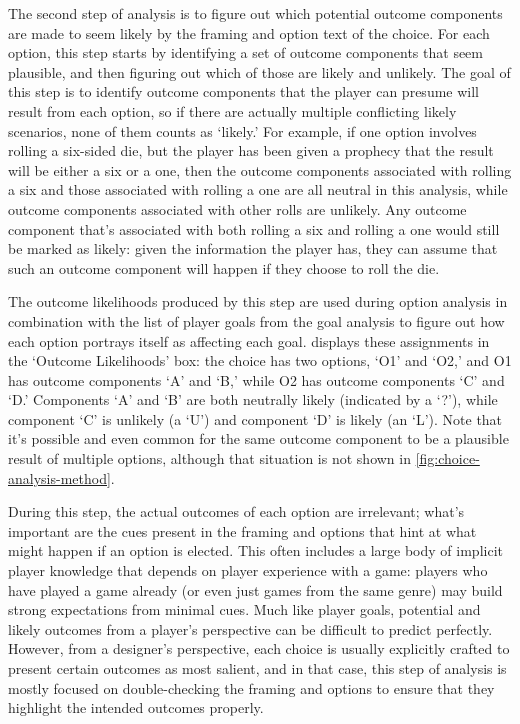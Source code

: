 \label{sec:cp-likelihood-analysis}

The second step of analysis is to figure out which potential outcome components are made to seem likely by the framing and option text of the choice.
%
For each option, this step starts by identifying a set of outcome components that seem plausible, and then figuring out which of those are likely and unlikely.
%
The goal of this step is to identify outcome components that the player can presume will result from each option, so if there are actually multiple conflicting likely scenarios, none of them counts as `likely.'
%
For example, if one option involves rolling a six-sided die, but the player has been given a prophecy that the result will be either a six or a one, then the outcome components associated with rolling a six and those associated with rolling a one are all neutral in this analysis, while outcome components associated with other rolls are unlikely. 
%
Any outcome component that's associated with both rolling a six and rolling a one would still be marked as likely: given the information the player has, they can assume that such an outcome component will happen if they choose to roll the die.


The outcome likelihoods produced by this step are used during option analysis in combination with the list of player goals from the goal analysis to figure out how each option portrays itself as affecting each goal.
%
 displays these assignments in the `Outcome Likelihoods' box: the choice has two options, `O1' and `O2,' and O1 has outcome components `A' and `B,' while O2 has outcome components `C' and `D.'
%
Components `A' and `B' are both neutrally likely (indicated by a `?'), while component `C' is unlikely (a `U') and component `D' is likely (an `L').
%
Note that it's possible and even common for the same outcome component to be a plausible result of multiple options, although that situation is not shown in \cref{fig:choice-analysis-method}.


During this step, the actual outcomes of each option are irrelevant; what's important are the cues present in the framing and options that hint at what might happen if an option is elected.
%
This often includes a large body of implicit player knowledge that depends on player experience with a game: players who have played a game already (or even just games from the same genre) may build strong expectations from minimal cues.
%
Much like player goals, potential and likely outcomes from a player's perspective can be difficult to predict perfectly.
%
However, from a designer's perspective, each choice is usually explicitly crafted to present certain outcomes as most salient, and in that case, this step of analysis is mostly focused on double-checking the framing and options to ensure that they highlight the intended outcomes properly.


